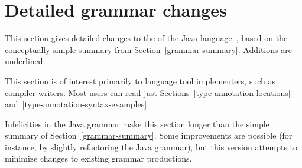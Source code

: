 \documentclass[10pt]{article}
\begin{document}
\section{Detailed grammar changes\label{grammar-details}}

This section
gives detailed changes to the  of the Java
language~\cite[ch.~18]{GoslingJSB2005}, based on the conceptually
simple summary from Section~\ref{grammar-summary}. 
Additions are \underline{underlined}.

This section is of interest primarily to language tool implementers, such
as compiler writers.  Most users can read just
Sections~\ref{type-annotation-locations} and~\ref{type-annotation-syntax-examples}.

Infelicities in the Java grammar make this section longer than the simple
summary of Section~\ref{grammar-summary}.  Some improvements are
possible (for instance, by slightly refactoring the Java grammar), but this
version attempts to minimize changes to existing grammar productions.
\end{document}
